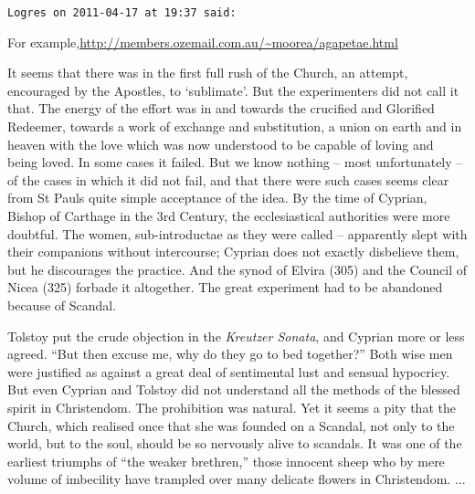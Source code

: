 \begin{footnotesize}
\begin{sffamily}
\hfill

\texttt{Logres on 2011-04-17 at 19:37 said:}

For example,\url{http://members.ozemail.com.au/~moorea/agapetae.html}

\begin{quotationx}\footnotesize

It seems that there was in the first full rush of the Church, an attempt, encouraged by the Apostles, to `sublimate'. But the experimenters did not call it that. The energy of the effort was in and towards the crucified and Glorified Redeemer, towards a work of exchange and substitution, a union on earth and in heaven with the love which was now understood to be capable of loving and being loved. In some cases it failed. But we know nothing -- most unfortunately -- of the cases in which it did not fail, and that there were such cases seems clear from St Pauls quite simple acceptance of the idea. By the time of Cyprian, Bishop of Carthage in the 3rd Century, the ecclesiastical authorities were more doubtful. The women, sub-introductae as they were called -- apparently slept with their companions without intercourse; Cyprian does not exactly disbelieve them, but he discourages the practice. And the synod of Elvira (305) and the Council of Nicea (325) forbade it altogether. The great experiment had to be abandoned because of Scandal.

Tolstoy put the crude objection in the \textit{Kreutzer Sonata}, and Cyprian more or less agreed. ``But then excuse me, why do they go to bed together?'' Both wise men were justified as against a great deal of sentimental lust and sensual hypocricy. But even Cyprian and Tolstoy did not understand all the methods of the blessed spirit in Christendom. The prohibition was natural. Yet it seems a pity that the Church, which realised once that she was founded on a Scandal, not only to the world, but to the soul, should be so nervously alive to scandals. It was one of the earliest triumphs of ``the weaker brethren,'' those innocent sheep who by mere volume of imbecility have trampled over many delicate flowers in Christendom. ...

\end{quotationx}

\end{sffamily}
\end{footnotesize}

